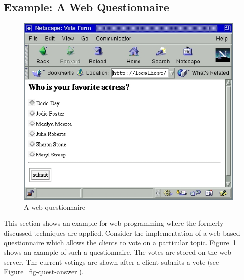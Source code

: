 \subsection{Example: A Web Questionnaire}

\begin{figure}[t]
\begin{center}
\includegraphics[scale=0.8]{PICTURES/quest.jpg}
\end{center}\vspace{-3ex}
\caption{A web questionnaire\label{fig-quest}}
\end{figure}

This section shows an example for web programming
where the formerly discussed techniques are applied.
Consider the implementation of a web-based questionnaire
which allows the clients to vote on a particular topic.
Figure~\ref{fig-quest} shows an example of such a questionnaire.
The votes are stored on the web server.
The current votings are shown after a client
submits a vote (see Figure~\ref{fig-quest-answer}).

